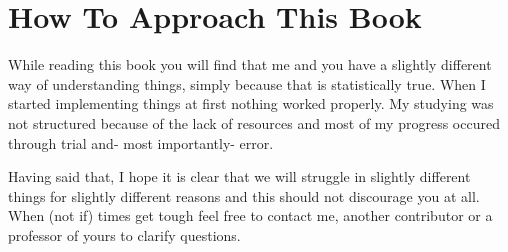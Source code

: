 \section{How To Approach This Book}

While reading this book you will find that me and you have a slightly different way of understanding things,
simply because that is statistically true. When I started implementing things at first nothing worked properly. 
My studying was not structured because of the lack of resources and most of my progress occured through trial and- most
importantly- error. 

Having said that, I hope it is clear that we will struggle in slightly different things for slightly
different reasons and this should not discourage you at all. When (not if) times get tough feel free to contact me, another 
contributor or a professor of yours to clarify questions.